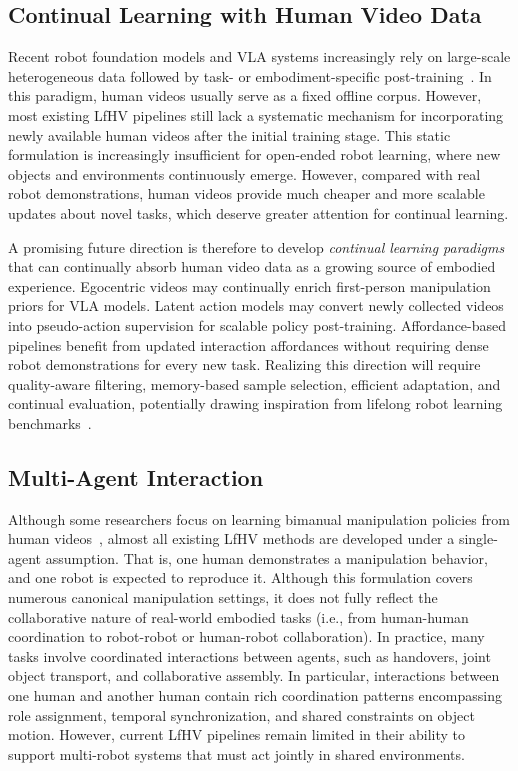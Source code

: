 \documentclass[Afour,sageh,times]{sagej}
\begin{document}
\subsection{Continual Learning with Human Video Data}

Recent robot foundation models and VLA systems increasingly rely on large-scale heterogeneous data followed by task- or embodiment-specific post-training~\citep{black2024pi_0,bjorck2025gr00t,luo2025being,yang2025egovla,lyu2026lda}. In this paradigm, human videos usually serve as a fixed offline corpus. However, most existing LfHV pipelines still lack a systematic mechanism for incorporating newly available human videos after the initial training stage. This static formulation is increasingly insufficient for open-ended robot learning, where new objects and environments continuously emerge. However, compared with real robot demonstrations, human videos provide much cheaper and more scalable updates about novel tasks, which deserve greater attention for continual learning.

A promising future direction is therefore to develop \textit{continual learning paradigms} that can continually absorb human video data as a growing source of embodied experience. Egocentric videos may continually enrich first-person manipulation priors for VLA models. Latent action models may convert newly collected videos into pseudo-action supervision for scalable policy post-training. Affordance-based pipelines benefit from updated interaction affordances without requiring dense robot demonstrations for every new task. Realizing this direction will require quality-aware filtering, memory-based sample selection, efficient adaptation, and continual evaluation, potentially drawing inspiration from lifelong robot learning benchmarks~\citep{liu2023libero}. 


\subsection{Multi-Agent Interaction}

Although some researchers focus on learning bimanual manipulation policies from human videos~\citep{bahety2024screwmimic,li2025maniptrans,zhou2025you,bi2026h}, almost all existing LfHV methods are developed under a single-agent assumption. That is, one human demonstrates a manipulation behavior, and one robot is expected to reproduce it. Although this formulation covers numerous canonical manipulation settings, it does not fully reflect the collaborative nature of real-world embodied tasks (i.e., from human-human coordination to robot-robot or human-robot collaboration). In practice, many tasks involve coordinated interactions between agents, such as handovers, joint object transport, and collaborative assembly. In particular, interactions between one human and another human contain rich coordination patterns encompassing role assignment, temporal synchronization, and shared constraints on object motion. However, current LfHV pipelines remain limited in their ability to support multi-robot systems that must act jointly in shared environments.
\end{document}
